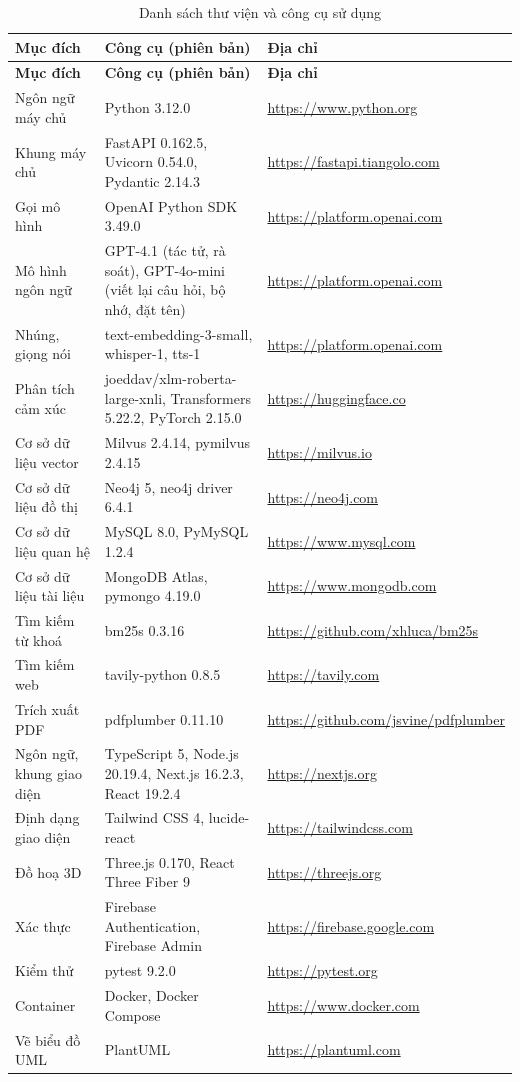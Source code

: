 \documentclass[../DoAn.tex]{subfiles}
\begin{document}
\begin{longtable}{|L{4.0cm}|L{4.8cm}|L{4.6cm}|}
\caption{Danh sách thư viện và công cụ sử dụng}\label{tab:congcu}\\
\hline
\textbf{Mục đích} & \textbf{Công cụ (phiên bản)} & \textbf{Địa chỉ} \\ \hline
\endfirsthead
\hline
\textbf{Mục đích} & \textbf{Công cụ (phiên bản)} & \textbf{Địa chỉ} \\ \hline
\endhead
Ngôn ngữ máy chủ & Python 3.12.0 & \url{https://www.python.org} \\ \hline
Khung máy chủ & FastAPI 0.162.5, Uvicorn 0.54.0, Pydantic 2.14.3 & \url{https://fastapi.tiangolo.com} \\ \hline
Gọi mô hình & OpenAI Python SDK 3.49.0 & \url{https://platform.openai.com} \\ \hline
Mô hình ngôn ngữ & GPT-4.1 (tác tử, rà soát), GPT-4o-mini (viết lại câu hỏi, bộ nhớ, đặt tên) & \url{https://platform.openai.com} \\ \hline
Nhúng, giọng nói & text-embedding-3-small, whisper-1, tts-1 & \url{https://platform.openai.com} \\ \hline
Phân tích cảm xúc & joeddav/xlm-roberta-large-xnli, Transformers 5.22.2, PyTorch 2.15.0 & \url{https://huggingface.co} \\ \hline
Cơ sở dữ liệu vector & Milvus 2.4.14, pymilvus 2.4.15 & \url{https://milvus.io} \\ \hline
Cơ sở dữ liệu đồ thị & Neo4j 5, neo4j driver 6.4.1 & \url{https://neo4j.com} \\ \hline
Cơ sở dữ liệu quan hệ & MySQL 8.0, PyMySQL 1.2.4 & \url{https://www.mysql.com} \\ \hline
Cơ sở dữ liệu tài liệu & MongoDB Atlas, pymongo 4.19.0 & \url{https://www.mongodb.com} \\ \hline
Tìm kiếm từ khoá & bm25s 0.3.16 & \url{https://github.com/xhluca/bm25s} \\ \hline
Tìm kiếm web & tavily-python 0.8.5 & \url{https://tavily.com} \\ \hline
Trích xuất PDF & pdfplumber 0.11.10 & \url{https://github.com/jsvine/pdfplumber} \\ \hline
Ngôn ngữ, khung giao diện & TypeScript 5, Node.js 20.19.4, Next.js 16.2.3, React 19.2.4 & \url{https://nextjs.org} \\ \hline
Định dạng giao diện & Tailwind CSS 4, lucide-react & \url{https://tailwindcss.com} \\ \hline
Đồ hoạ 3D & Three.js 0.170, React Three Fiber 9 & \url{https://threejs.org} \\ \hline
Xác thực & Firebase Authentication, Firebase Admin & \url{https://firebase.google.com} \\ \hline
Kiểm thử & pytest 9.2.0 & \url{https://pytest.org} \\ \hline
Container & Docker, Docker Compose & \url{https://www.docker.com} \\ \hline
Vẽ biểu đồ UML & PlantUML & \url{https://plantuml.com} \\ \hline
\end{longtable}
\end{document}
